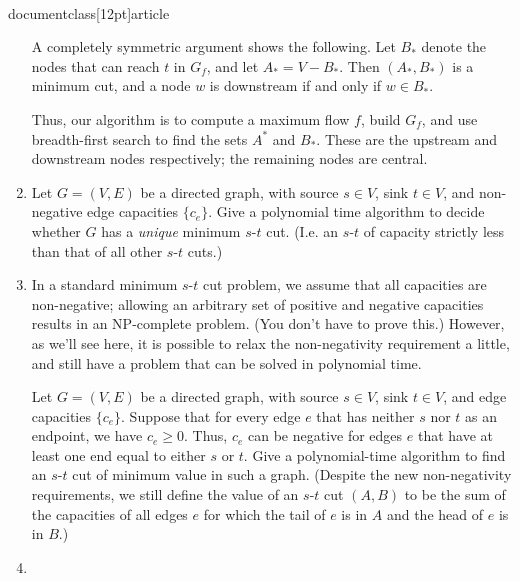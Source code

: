 \\documentclass[12pt]{article}
\begin{document}
\begin{enumerate}
{A completely symmetric argument shows the following.
Let $B_*$ denote the nodes that can reach $t$ in $G_f$,
and let $A_* = V - B_*$.
Then $(A_*, B_*)$ is a minimum cut, and a node 
$w$ is downstream if and only if $w \in B_*$.

Thus, our algorithm is to compute a maximum flow $f$, 
build $G_f$, and use breadth-first search to find the
sets $A^*$ and $B_*$.
These are the upstream and downstream nodes respectively;
the remaining nodes are central.

}



\item 

Let $G = (V,E)$ be a directed graph, with
source $s \in V$, sink $t \in V$,
and non-negative edge capacities $\{c_e\}$.
Give a polynomial time algorithm to decide whether
$G$ has a {\em unique} minimum $s$-$t$ cut.
(I.e. an $s$-$t$ of capacity strictly less
than that of all other $s$-$t$ cuts.)



\item 

In a standard minimum $s$-$t$ cut problem, we assume
that all capacities are non-negative;
allowing an arbitrary set of positive and negative
capacities results in an NP-complete problem.
(You don't have to prove this.)
However, as we'll see here,
it is possible to relax the non-negativity
requirement a little, and still have a problem
that can be solved in polynomial time.

Let $G = (V,E)$ be a directed graph, with
source $s \in V$, sink $t \in V$,
and edge capacities $\{c_e\}$.
Suppose that for every edge $e$ that has neither
$s$ nor $t$ as an endpoint, we have $c_e \geq 0$.
Thus, $c_e$ can be negative for edges $e$ that have
at least one end equal to either $s$ or $t$.
Give a polynomial-time algorithm to find an
$s$-$t$ cut of minimum value in such a graph.
(Despite the new non-negativity requirements,
we still define the value of an $s$-$t$ cut $(A,B)$
to be the sum of the capacities of all edges $e$
for which the tail of $e$ is in $A$ and the head
of $e$ is in $B$.)






\item 


\end{enumerate}
\end{document}

